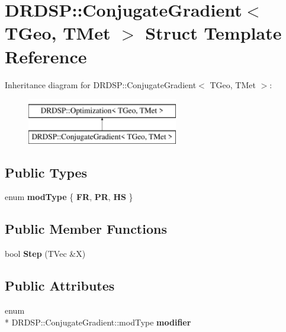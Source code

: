 \hypertarget{struct_d_r_d_s_p_1_1_conjugate_gradient}{\section{D\-R\-D\-S\-P\-:\-:Conjugate\-Gradient$<$ T\-Geo, T\-Met $>$ Struct Template Reference}
\label{struct_d_r_d_s_p_1_1_conjugate_gradient}
}
Inheritance diagram for D\-R\-D\-S\-P\-:\-:Conjugate\-Gradient$<$ T\-Geo, T\-Met $>$\-:\begin{figure}[H]
\begin{center}
\leavevmode
\includegraphics[height=2.000000cm]{struct_d_r_d_s_p_1_1_conjugate_gradient}
\end{center}
\end{figure}
\subsection*{Public Types}
\begin{DoxyCompactItemize}
\item 
enum {\bfseries mod\-Type} \{ {\bfseries F\-R}, 
{\bfseries P\-R}, 
{\bfseries H\-S}
 \}
\end{DoxyCompactItemize}
\subsection*{Public Member Functions}
\begin{DoxyCompactItemize}
\item 
\hypertarget{struct_d_r_d_s_p_1_1_conjugate_gradient_a79601a41402b9ba82234a8ed782cd662}{bool {\bfseries Step} (T\-Vec \&X)}\label{struct_d_r_d_s_p_1_1_conjugate_gradient_a79601a41402b9ba82234a8ed782cd662}

\end{DoxyCompactItemize}
\subsection*{Public Attributes}
\begin{DoxyCompactItemize}
\item 
\hypertarget{struct_d_r_d_s_p_1_1_conjugate_gradient_a6a28f2d0f81e66b30feb1424c78c6b59}{enum \\*
D\-R\-D\-S\-P\-::\-Conjugate\-Gradient\-::mod\-Type {\bfseries modifier}}\label{struct_d_r_d_s_p_1_1_conjugate_gradient_a6a28f2d0f81e66b30feb1424c78c6b59}

\end{DoxyCompactItemize}

